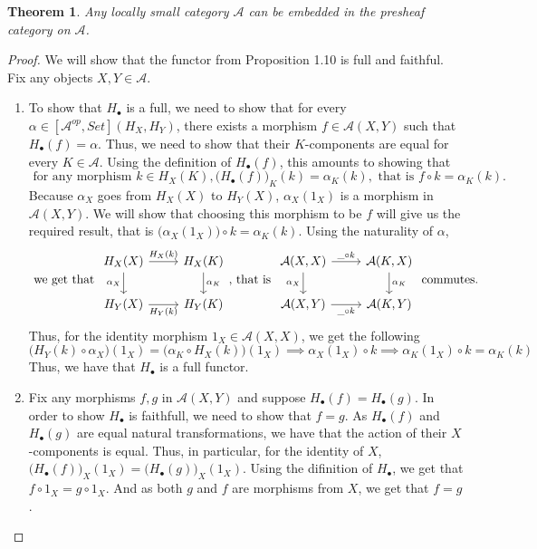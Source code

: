 \documentclass[18pt,a4paper]{article}
\newtheorem{theorem}{Theorem}[section]
\theoremstyle{definition}
\begin{document}
		\begin{theorem}
			Any locally small category $\mathcal{A}$ can be embedded in the presheaf category on
			$\mathcal{A}$.
		\end{theorem}
		\begin{proof} \setcounter{equation}{0}
			We will show that the functor from Proposition 1.10 is
			full and faithful. Fix any objects $X,Y \in \mathcal{A}$.
			\begin{enumerate}[label=\Roman*]
				\item To show that $H_\bullet$ is a full, we need to show that for every $\alpha
					\in [\mathcal{A} ^{op},Set](H_X,H_Y)$, there exists a morphism
					$f\in \mathcal{A} (X,Y)$ such that $H_\bullet(f)=\alpha$. Thus, we need
					to show that their $K$-components are equal for every $K \in \mathcal{A}$.
					Using the definition of $H_\bullet(f)$, this amounts to showing that
					\begin{equation}  \text{ for any morphism } k \in H_X(K),
						\Big(H_\bullet(f)\Big)_K^{}(k)=\alpha_K(k), \text{ that is }
						f\circ k=\alpha_K(k).
					\end{equation}
					Because $\alpha_X$ goes from $H_X(X)$ to $H_Y(X)$, $\alpha_X(1_X)$ is a morphism
					in $\mathcal{A}(X,Y)$. We will show that choosing this morphism to be $f$
					will give us the required result, that is $\big( \alpha_X(1_X) \big) \circ
					k=\alpha_K(k)$. Using the naturality of $\alpha$,
					\[ \text{ we get that }
						\begin{tikzcd}
							H_X(X) \arrow[swap]{d}{\alpha_X} \arrow{r}{H_X(k)}
			& H_X(K) \arrow{d}{\alpha_K}\\
			H_Y(X) \arrow[swap]{r}{H_Y(k)}
			& H_Y(K)
						\end{tikzcd}
						\text{, that is }
						\begin{tikzcd}
							\mathcal{A} (X,X) \arrow[swap]{d}{\alpha_X} \arrow{r}{\string _ \circ k}
			& \mathcal{A} (K,X) \arrow{d}{\alpha_K}\\
			\mathcal{A} (X,Y) \arrow[swap]{r}{\string _ \circ k}
			& \mathcal{A} (K,Y)
						\end{tikzcd}
					\text{ commutes. }\]
					Thus, for the identity morphism $1_X \in \mathcal{A} (X,X)$, we get the following
					\[ \Big(H_Y(k) \circ \alpha_X\Big)(1_X)=\Big(\alpha_K \circ H_X(k)\Big)(1_X)
						\implies  \alpha_X(1_X) \circ k \implies
					\alpha_K(1_X) \circ k=\alpha_K(k)\]
					Thus, we have that $H_\bullet$ is a full functor.

				\item  Fix any morphisms $f,g$ in $\mathcal{A} (X,Y)$ and suppose
					$H_\bullet(f)=H_\bullet(g)$. In order to show $H_\bullet$ is faithfull,
					we need to show that $f=g$. As $H_\bullet(f)$ and $H_\bullet(g)$ are equal natural
					transformations, we have that the action of their $X$-components is equal. Thus,
					in particular, for the identity of $X$, $\big(H_\bullet(f) \big)_X (1_X)
					= \big(H_\bullet(g) \big)_X (1_X)$. Using the difinition of $H_\bullet$, we get
					that $f \circ 1_X = g \circ 1_X$. And as both $g$ and $f$ are morphisms
					from $X$, we get that $f=g$.
			\end{enumerate}
		\end{proof}
\end{document}
